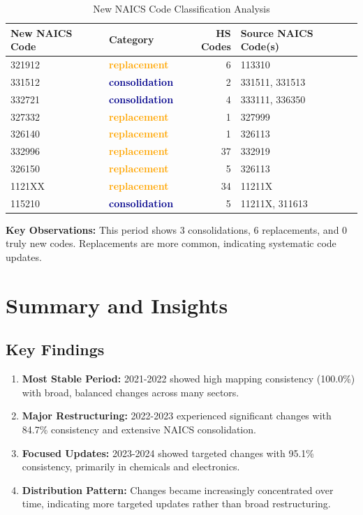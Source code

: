 \documentclass[11pt]{article}
\begin{document}
\begin{table}[H]
\centering
{}
\begin{tabular}{llrl}
\toprule
\textbf{New NAICS Code} & \textbf{Category} & \textbf{HS Codes} & \textbf{Source NAICS Code(s)} \\
\midrule
321912 & \textcolor{orange}{\textbf{replacement}} & 6 & 113310 \\
331512 & \textcolor{darkblue}{\textbf{consolidation}} & 2 & 331511, 331513 \\
332721 & \textcolor{darkblue}{\textbf{consolidation}} & 4 & 333111, 336350 \\
327332 & \textcolor{orange}{\textbf{replacement}} & 1 & 327999 \\
326140 & \textcolor{orange}{\textbf{replacement}} & 1 & 326113 \\
332996 & \textcolor{orange}{\textbf{replacement}} & 37 & 332919 \\
326150 & \textcolor{orange}{\textbf{replacement}} & 5 & 326113 \\
1121XX & \textcolor{orange}{\textbf{replacement}} & 34 & 11211X \\
115210 & \textcolor{darkblue}{\textbf{consolidation}} & 5 & 11211X, 311613 \\
\bottomrule
\end{tabular}
\caption{New NAICS Code Classification Analysis}
\end{table}

\textbf{Key Observations:} This period shows 3 consolidations, 6 replacements, and 0 truly new codes. Replacements are more common, indicating systematic code updates.

\newpage


\section{Summary and Insights}

\subsection{Key Findings}

\begin{enumerate}
    \item \textbf{Most Stable Period:} 2021-2022 showed high mapping consistency (100.0\%) with broad, balanced changes across many sectors.
    
    \item \textbf{Major Restructuring:} 2022-2023 experienced significant changes with 84.7\% consistency and extensive NAICS consolidation.
    
    \item \textbf{Focused Updates:} 2023-2024 showed targeted changes with 95.1\% consistency, primarily in chemicals and electronics.
    
    \item \textbf{Distribution Pattern:} Changes became increasingly concentrated over time, indicating more targeted updates rather than broad restructuring.
\end{enumerate}
\end{document}
